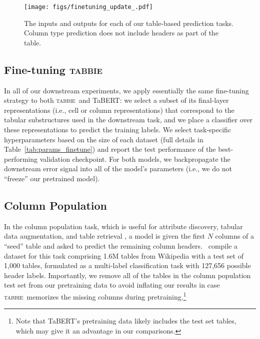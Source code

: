 \documentclass[11pt]{article}
\newcommand{\name}[0]{\textsc{tabbie}}
\begin{document}
\makeatother
\begin{figure}
    \centering
\texttt{[image: figs/finetuning\_update\_.pdf]}
  \caption{The inputs and outputs for each of our table-based prediction tasks. Column type prediction does not include headers as part of the table.}
  \label{fig:finetune}
\end{figure} \begin{table}
\centering
{}
\caption{Fine-tuning hyperparameters of each downstream task for \name\ and TaBERT.}\label{tab:params_finetune}
\end{table}
 
\subsection{Fine-tuning \name}
In all of our downstream experiments, we apply essentially the same fine-tuning strategy to both \name\ and TaBERT: we select a subset of its final-layer representations (i.e., cell or column representations) that correspond to the tabular substructures used in the downstream task, and we place a classifier over these representations to predict the training labels. We select task-specific hyperparameters based on the size of each dataset (full details in Table~\ref{tab:params_finetune}) and report the test performance of the best-performing validation checkpoint. For both models, we backpropagate the downstream error signal into all of the model's parameters (i.e., we do not ``freeze'' our pretrained model).



\subsection{Column Population}
In the column population task, which is useful for attribute discovery, tabular data augmentation, and table retrieval \cite{dassarma-finding}, a model is given the first $N$ columns of a ``seed'' table and asked to predict the remaining column headers.~\citet{entitables} compile a dataset for this task comprising 1.6M tables from Wikipedia with a test set of 1,000 tables, formulated as a multi-label classification task with 127,656 possible header labels. Importantly, we remove all of the tables in the column population test set from our pretraining data to avoid inflating our results in case \name\ memorizes the missing columns during pretraining.\footnote{Note that TaBERT's pretraining data likely includes the test set tables, which may give it an advantage in our comparisons.} 
\end{document}
